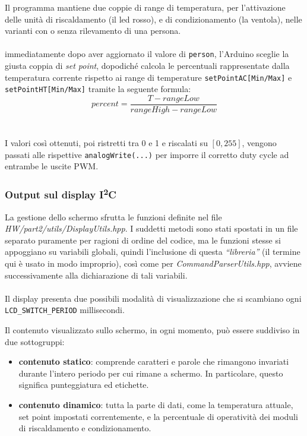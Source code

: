 \documentclass[12pt,a4paper]{article}
\begin{document}
Il programma mantiene due coppie di range di temperatura, per l'attivazione delle unità di riscaldamento (il led rosso), e di condizionamento (la ventola), nelle varianti con o senza rilevamento di una persona.
\\ \\
immediatamente dopo aver aggiornato il valore di \verb|person|, l'Arduino sceglie la giusta coppia di \textit{set point}, dopodiché calcola le percentuali rappresentate dalla temperatura corrente rispetto ai range di temperature \verb|setPointAC[Min/Max]| e \verb|setPointHT[Min/Max]| tramite la seguente formula:
$$percent = \frac{T-rangeLow}{rangeHigh-rangeLow}$$
\\ \\
I valori così ottenuti, poi ristretti tra 0 e 1 e riscalati su $[0,255]$, vengono passati alle rispettive \verb|analogWrite(...)| per imporre il corretto duty cycle ad entrambe le uscite PWM.

\subsubsection{Output sul display \texorpdfstring{I\textsuperscript{2}C}{i2c}}

La gestione dello schermo sfrutta le funzioni definite nel file \textit{HW/part2/utils/Display\-Utils.hpp}. I suddetti metodi sono stati spostati in un file separato puramente per ragioni di ordine del codice, ma le funzioni stesse si appoggiano su variabili globali, quindi l'inclusione di questa \textit{``libreria''} (il termine qui è usato in modo improprio), così come per \textit{CommandParserUtils.hpp}, avviene successivamente alla dichiarazione di tali variabili.
\\ \\
Il display presenta due possibili modalità di visualizzazione che si scambiano ogni \verb|LCD_SWITCH_PERIOD| millisecondi.

Il contenuto visualizzato sullo schermo, in ogni momento, può essere suddiviso in due sottogruppi:
\begin{itemize}
    \item \textbf{contenuto statico}: comprende caratteri e parole che rimangono invariati durante l'intero periodo per cui rimane a schermo. In particolare, questo significa punteggiatura ed etichette.
    \item \textbf{contenuto dinamico}: tutta la parte di dati, come la temperatura attuale, set point impostati correntemente, e la percentuale di operatività dei moduli di riscaldamento e condizionamento.
\end{itemize}
\end{document}
